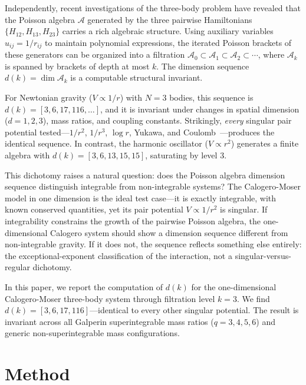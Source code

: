 \documentclass[aps,prl,twocolumn,superscriptaddress,showpacs]{revtex4-2}
\newcommand{\calA}{\mathcal{A}}
\begin{document}
Independently, recent investigations of the three-body problem have
revealed that the Poisson algebra $\calA$ generated by the three
pairwise Hamiltonians $\{H_{12}, H_{13}, H_{23}\}$ carries a rich
algebraic structure.  Using auxiliary variables $u_{ij} = 1/r_{ij}$ to
maintain polynomial expressions, the iterated Poisson brackets of
these generators can be organized into a filtration
$\calA_0 \subset \calA_1 \subset \calA_2 \subset \cdots$, where
$\calA_k$ is spanned by brackets of depth at most $k$.  The dimension
sequence $d(k) = \dim \calA_k$ is a computable structural invariant.

For Newtonian gravity ($V \propto 1/r$) with $N = 3$ bodies, this
sequence is $d(k) = [3, 6, 17, 116, \ldots]$, and it is invariant
under changes in spatial dimension ($d = 1, 2, 3$), mass ratios, and
coupling constants.  Strikingly, \emph{every} singular pair potential
tested---$1/r^2$, $1/r^3$, $\log r$, Yukawa, and
Coulomb~\cite{paper1,paper3}---produces the identical sequence.  In contrast, the harmonic oscillator
($V \propto r^2$) generates a finite algebra with $d(k) = [3, 6, 13,
15, 15]$, saturating by level 3.

This dichotomy raises a natural question: does the Poisson algebra
dimension sequence distinguish integrable from non-integrable systems?
The Calogero-Moser model in one dimension is the ideal test case---it
is exactly integrable, with known conserved quantities, yet its pair
potential $V \propto 1/r^2$ is singular.  If integrability constrains
the growth of the pairwise Poisson algebra, the one-dimensional
Calogero system should show a dimension sequence different from
non-integrable gravity.  If it does not, the sequence reflects
something else entirely: the exceptional-exponent classification of
the interaction, not a singular-versus-regular dichotomy.

In this paper, we report the computation of $d(k)$ for the
one-dimensional Calogero-Moser three-body system through filtration
level $k = 3$.  We find $d(k) = [3, 6, 17, 116]$---identical to every
other singular potential.  The result is invariant across all Galperin
superintegrable mass ratios ($q = 3, 4, 5, 6$) and generic
non-superintegrable mass configurations.


\section{Method}
\label{sec:method}
\end{document}
